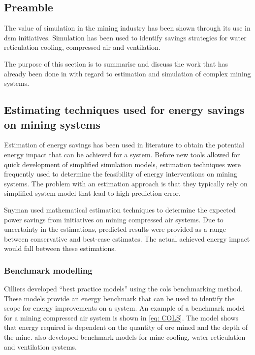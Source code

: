 	\subsection{Preamble}
	The value of simulation in  the mining industry has been shown through its use in \gls{dsm} initiatives. Simulation has been used to identify savings strategies for water reticulation cooling, compressed air and ventilation.
	\par The purpose of this section is to summarise and discuss the work that has already been done in with regard to estimation and simulation of complex mining systems. 
	
	\subsection{Estimating techniques used for energy savings on mining systems }
	Estimation of energy savings has been used in literature to obtain the potential energy impact that can be achieved for a system. Before new tools allowed for quick development of simplified simulation models, estimation techniques were frequently used to determine the feasibility of energy interventions on mining systems. The problem with an estimation approach is that they typically rely on simplified system model that lead to high prediction error.
		\par 
		Snyman \cite{Snyman2011Masters} used mathematical estimation techniques to determine the expected power savings from initiatives on mining compressed air systems.  Due to uncertainty in the estimations, \cite{Snyman2011Masters} predicted results were provided as a range between conservative and best-case estimates. The actual achieved energy impact would fall between these estimations.
		 	
		\subsubsection{Benchmark modelling}
		 Cilliers \cite{Cilliers2015PHD} developed \enquote{best practice models} using the \gls{cols} benchmarking method. These models provide an energy benchmark that can be used to identify the scope for energy improvements on a system. An example of a benchmark model for a mining compressed air system is shown in \cref{eq: COLS}. The model shows that energy required is dependent on the quantity of ore mined and the depth of the mine. \cite{Cilliers2015PHD} also developed benchmark models for mine cooling, water reticulation and ventilation systems.

